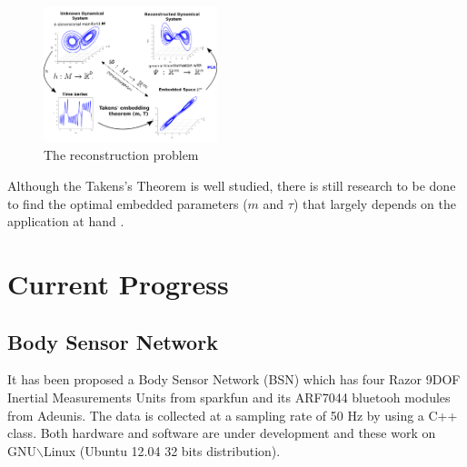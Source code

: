 \documentclass{sigchi}
\begin{document}
\begin{figure}[htbp!] 
\centering    
\includegraphics[width=0.45\textwidth]{takens_theorem_v3}
\caption[PA]{The reconstruction problem}
\label{fig:takens_theorem}
\end{figure}

Although the Takens's Theorem is well studied, there is still 
research to be done to find the optimal embedded parameters ($m$ and $\tau$) 
that largely depends on the application at hand \cite{J.FrankS.Mannor2010,Sama2013}.


\section{Current Progress}

\subsection{Body Sensor Network}
It has been proposed a Body Sensor Network (BSN) which has four Razor 
9DOF Inertial Measurements Units from sparkfun and its ARF7044 bluetooh modules 
from Adeunis. The data is collected at a sampling rate of 50 Hz by using a C++ class. 
Both hardware and software are under development and these work on 
GNU$\backslash$Linux (Ubuntu 12.04 32 bits distribution).
\end{document}
